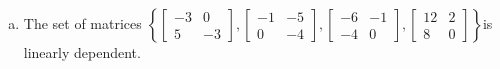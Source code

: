 \begin{exerciseAnswer}
\begin{enumerate}[(a)]
\item The set of matrices \( \left\{ \left[\begin{array}{cc}
-3 & 0 \\
5 & -3
\end{array}\right] , \left[\begin{array}{cc}
-1 & -5 \\
0 & -4
\end{array}\right] , \left[\begin{array}{cc}
-6 & -1 \\
-4 & 0
\end{array}\right] , \left[\begin{array}{cc}
12 & 2 \\
8 & 0
\end{array}\right] \right\} \)is linearly dependent.
\end{enumerate}
    
\end{exerciseAnswer}
    
